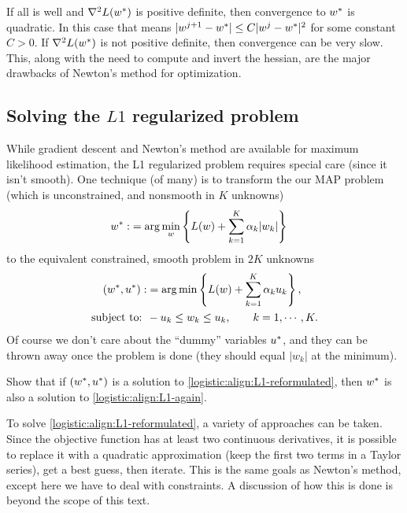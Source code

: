 If all is well and $\nabla^2L({w^\ast})$ is positive definite, then convergence to ${w^\ast}$ is quadratic.  In this case that means $|w^{j+1}-{w^\ast}| \leq C |w^j - {w^\ast}|^2$ for some constant $C>0$.  If $\nabla^2L({w^\ast})$ is not positive definite, then convergence can be very slow.  This, along with the need to compute and invert the hessian, are the major drawbacks of Newton's method for optimization.

\subsection{Solving the $L1$ regularized problem}
While gradient descent and Newton's method are available for maximum likelihood estimation, the L1 regularized problem requires special care (since it isn't smooth).  One technique (of many) is to transform the our MAP problem (which is unconstrained, and nonsmooth in $K$ unknowns)
\begin{align}
  \label{logistic:align:L1-again}
  {w^\ast} :&= \arg\min_w \left\{ L(w) + \sum_{k=1}^K\alpha_k|w_k| \right\}
\end{align}
to the equivalent constrained, smooth problem in $2K$ unknowns
\begin{align}
  \label{logistic:align:L1-reformulated}
  \begin{split}
    ({w^\ast}, {u^\ast}) :&= \arg\min\left\{ L(w) + \sum_{k=1}^K\alpha_ku_k \right\},\\
    \mbox{subject to: }& -u_k\leq w_k \leq u_k,\qquad k=1,\cdots,K.
  \end{split}
\end{align}
Of course we don't care about the ``dummy'' variables ${u^\ast}$, and they can be thrown away once the problem is done (they should equal $|w_k|$ at the minimum).

\begin{exercise}
  Show that if $({w^\ast}, {u^\ast})$ is a solution to \eqref{logistic:align:L1-reformulated}, then ${w^\ast}$ is also a solution to \eqref{logistic:align:L1-again}.  
\end{exercise}

To solve \eqref{logistic:align:L1-reformulated}, a variety of approaches can be taken.  Since the objective function has at least two continuous derivatives, it is possible to replace it with a quadratic approximation (keep the first two terms in a Taylor series), get a best guess, then iterate.  This is the same goals as Newton's method, except here we have to deal with constraints.  A discussion of how this is done is beyond the scope of this text.

